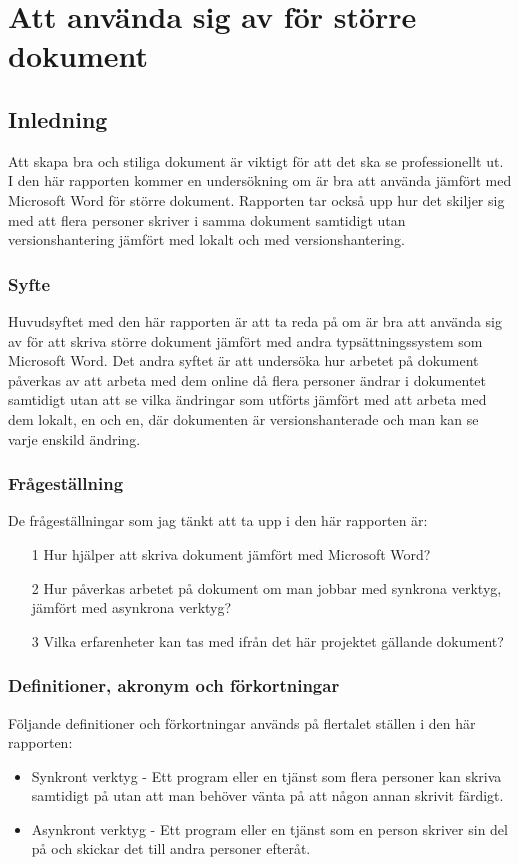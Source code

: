\chapter{Att använda sig av \latex för större dokument}
\label{cha:indiv-report-tuhkala}

\section{Inledning}
\label{sec:introduction-tuhkala}
Att skapa bra och stiliga dokument är viktigt för att det ska se professionellt ut. I den här rapporten kommer en undersökning om \latex är bra att använda jämfört med Microsoft Word för större dokument. Rapporten tar också upp hur det skiljer sig med att flera personer skriver i samma dokument samtidigt utan versionshantering jämfört med lokalt och med versionshantering.

\subsection{Syfte}
\label{sec:purpose-tuhkala}
Huvudsyftet med den här rapporten är att ta reda på om \latex är bra att använda sig av för att skriva större dokument jämfört med andra typsättningssystem som Microsoft Word. Det andra syftet är att undersöka hur arbetet på dokument påverkas av att arbeta med dem online då flera personer ändrar i dokumentet samtidigt utan att se vilka ändringar som utförts jämfört med att arbeta med dem lokalt, en och en, där dokumenten är versionshanterade och man kan se varje enskild ändring.

\subsection{Frågeställning}
\label{sec:issue-tuhkala}
De frågeställningar som jag tänkt att ta upp i den här rapporten är:

\begin{itemize}
	\item [1] Hur hjälper \latex att skriva dokument jämfört med Microsoft Word?
	\item [2] Hur påverkas arbetet på dokument om man jobbar med synkrona verktyg, jämfört med asynkrona verktyg?
	\item [3] Vilka erfarenheter kan tas med ifrån det här projektet gällande dokument?
\end{itemize}

\subsection{Definitioner, akronym och förkortningar}
Följande definitioner och förkortningar används på flertalet ställen i den här rapporten:
\begin{itemize}
	\item Synkront verktyg - Ett program eller en tjänst som flera personer kan skriva samtidigt på utan att man behöver vänta på att någon annan skrivit färdigt.
	\item Asynkront verktyg - Ett program eller en tjänst som en person skriver sin del på och skickar det till andra personer efteråt.
\end{itemize}

